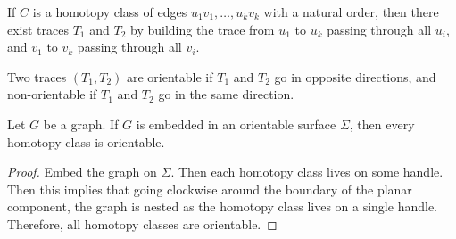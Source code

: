 \begin{claim}
	If \(C\) is a homotopy class of edges \(u_1 v_1, \ldots, u_k v_k\) with a natural order, then there exist traces \(T_1\) and \(T_2\) by building the trace from \(u_1\) to \(u_k\) passing through all \(u_i\), and \(v_1\) to \(v_k\) passing through all \(v_i\).
\end{claim}
Two traces $(T_1, T_2)$ are orientable if \(T_1\) and \(T_2\) go in opposite directions, and non-orientable if \(T_1\) and \(T_2\) go in the same direction.

\begin{lemma}
	Let $G$ be a graph. If \(G\) is embedded in an orientable surface $\Sigma$, then every homotopy class is orientable.
\end{lemma}
\begin{proof}
	Embed the graph on $\Sigma$. Then each homotopy class lives on some handle. Then this implies that going clockwise around the boundary of the planar component, the graph is nested as the homotopy class lives on a single handle. Therefore, all homotopy classes are orientable. 
\end{proof}

